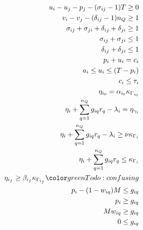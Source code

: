 \begin{subequations}
\label{eq:dynconstrs}
\begin{align}
    u_i - u_j - p_j - (\sigma_{ij} - 1)T \geq 0                             \label{subeq:m_time}         \\
    v_i - v_j - (\delta_{ij} - 1)n_Q \geq 1                             \label{subeq:m_space}        \\
    \sigma_{ij} + \sigma_{ji} + \delta_{ij} + \delta_{ji} \geq 1            \label{subeq:m_valid_pos}    \\
    \sigma_{ij} + \sigma_{ji} \leq 1                                        \label{subeq:m_sigma}        \\
    \delta_{ij} + \delta_{ji} \leq 1                                        \label{subeq:m_delta}        \\
    p_i + u_i = c_i                                                         \label{subeq:m_detach}       \\
    a_i \leq u_i \leq (T - p_i)                                             \label{subeq:m_valid_starts} \\
    c_i \leq \tau_i                                                         \label{subeq:m_valid_depart} \\
    \eta_{i_0} = \alpha_{i_0} \kappa_{\Gamma_{i_0}}                         \label{subeq:init_charge}    \\
    \eta_i + \sum_{q=1}^{n_Q} g_{iq} r_q - \lambda_i = \eta_{\gamma_i}          \label{subeq:next_charge}    \\
    \eta_i + \sum_{q=1}^{n_Q} g_{iq} r_q - \lambda_i \geq \nu \kappa_{\Gamma_i} \label{subeq:min_charge}     \\
    \eta_i + \sum_{q=1}^{n_Q} g_{iq} r_q \leq \kappa_{\Gamma_i}                 \label{subeq:max_charge}     \\
    \eta_{i_f} \geq \beta_{i_f} \kappa_{\Gamma_{i_f}} \mbox{\TODO{confusing}}                      \label{subeq:final_charge}   \\
    p_i - (1 - w_{iq})M \leq g_{iq}                                          \label{subeq:gpgret}         \\
    p_i \geq g_{iq}                                                          \label{subeq:gples}          \\
    Mw_{iq} \geq g_{iq}                                                     \label{subeq:gwgret}         \\
    0 \leq g_{iq}                                                           \label{subeq:gwles}          \\

\end{align}
\end{subequations}
